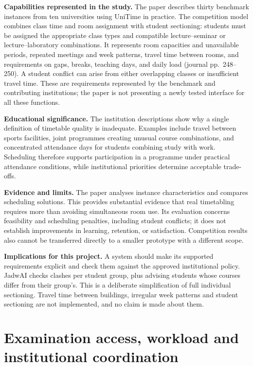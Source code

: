\textbf{Capabilities represented in the study.} The paper describes thirty benchmark instances from ten universities using UniTime in practice. The competition model combines class time and room assignment with student sectioning: students must be assigned the appropriate class types and compatible lecture--seminar or lecture--laboratory combinations. It represents room capacities and unavailable periods, repeated meetings and week patterns, travel time between rooms, and requirements on gaps, breaks, teaching days, and daily load (journal pp.~248--250). A student conflict can arise from either overlapping classes or insufficient travel time. These are requirements represented by the benchmark and contributing institutions; the paper is not presenting a newly tested interface for all these functions.

\textbf{Educational significance.} The institution descriptions show why a single definition of timetable quality is inadequate. Examples include travel between sports facilities, joint programmes creating unusual course combinations, and concentrated attendance days for students combining study with work. Scheduling therefore supports participation in a programme under practical attendance conditions, while institutional priorities determine acceptable trade-offs.

\textbf{Evidence and limits.} The paper analyses instance characteristics and compares scheduling solutions. This provides substantial evidence that real timetabling requires more than avoiding simultaneous room use. Its evaluation concerns feasibility and scheduling penalties, including student conflicts; it does not establish improvements in learning, retention, or satisfaction. Competition results also cannot be transferred directly to a smaller prototype with a different scope.

\textbf{Implications for this project.} A system should make its supported requirements explicit and check them against the approved institutional policy. JadwAI checks clashes per student group, plus advising students whose courses differ from their group's. This is a deliberate simplification of full individual sectioning. Travel time between buildings, irregular week patterns and student sectioning are not implemented, and no claim is made about them.

\section[Examination access and workload]{Examination access, workload and institutional coordination}
